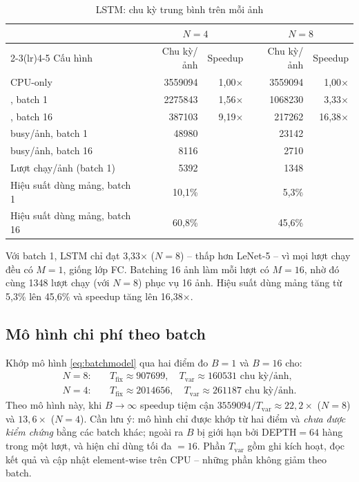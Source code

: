 \begin{table}[H]
  \centering
  \caption{LSTM: chu kỳ trung bình trên mỗi ảnh}
  \label{tab:lstm}
  \begin{tabular}{lrrrr}
    \toprule
     & \multicolumn{2}{c}{$N=4$} & \multicolumn{2}{c}{$N=8$}\\
    \cmidrule(lr){2-3}\cmidrule(lr){4-5}
    Cấu hình & Chu kỳ/ảnh & Speedup & Chu kỳ/ảnh & Speedup\\
    \midrule
    CPU-only & \num{3559094} & 1,00$\times$ & \num{3559094} & 1,00$\times$ \\
    \NPU{}, batch 1 & \num{2275843} & 1,56$\times$ & \num{1068230} & 3,33$\times$ \\
    \NPU{}, batch 16 & \num{387103} & 9,19$\times$ & \num{217262} & 16,38$\times$ \\
    \midrule
    \NPU{} busy/ảnh, batch 1 & \num{48980} & & \num{23142} & \\
    \NPU{} busy/ảnh, batch 16 & \num{8116} & & \num{2710} & \\
    Lượt chạy/ảnh (batch 1) & \num{5392} & & \num{1348} & \\
    Hiệu suất dùng mảng, batch 1 & 10,1\% & & 5,3\% & \\
    Hiệu suất dùng mảng, batch 16 & 60,8\% & & 45,6\% & \\
    \bottomrule
  \end{tabular}
\end{table}

Với batch 1, LSTM chỉ đạt 3,33$\times$ ($N=8$) -- thấp hơn LeNet-5 -- vì mọi lượt chạy đều có $M=1$, giống lớp FC. Batching 16 ảnh làm mỗi lượt có $M=16$, nhờ đó cùng 1348 lượt chạy (với $N=8$) phục vụ 16 ảnh. Hiệu suất dùng mảng tăng từ 5,3\% lên 45,6\% và speedup tăng lên 16,38$\times$.

\subsection{Mô hình chi phí theo batch}
Khớp mô hình \eqref{eq:batchmodel} qua hai điểm đo $B=1$ và $B=16$ cho:
\begin{align}
  N=8:&\quad T_\text{fix}\approx\num{907699},\quad T_\text{var}\approx\num{160531} \text{ chu kỳ/ảnh},\\
  N=4:&\quad T_\text{fix}\approx\num{2014656},\quad T_\text{var}\approx\num{261187} \text{ chu kỳ/ảnh}.
\end{align}
Theo mô hình này, khi $B\to\infty$ speedup tiệm cận $\num{3559094}/T_\text{var}\approx22{,}2\times$ ($N=8$) và $13{,}6\times$ ($N=4$). Cần lưu ý: mô hình chỉ được khớp từ hai điểm và \emph{chưa được kiểm chứng} bằng các batch khác; ngoài ra $B$ bị giới hạn bởi DEPTH$=64$ hàng trong một lượt, và  hiện chỉ dùng tối đa $=16$. Phần $T_\text{var}$ gồm ghi kích hoạt, đọc kết quả và cập nhật element-wise trên CPU -- những phần không giảm theo batch.

